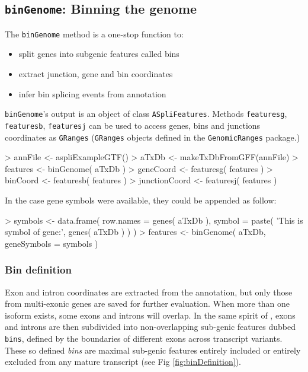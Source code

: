 \documentclass{article}
\begin{document}
\subsection{\texttt{binGenome}: Binning the genome }
\label{sectionBinG}

The \texttt{binGenome} method is a one-stop function to:
\begin{itemize}
 \item split genes into subgenic features called bins
 \item extract junction, gene and bin coordinates
 \item infer bin splicing events from annotation 
\end{itemize}

\texttt{binGenome}'s output is an object of class \texttt{ASpliFeatures}. 
Methods \texttt{featuresg}, \texttt{featuresb}, \texttt{featuresj} can be used to access genes, bins and junctions coordinates as \texttt{GRanges} (\texttt{GRanges} objects defined in the \texttt{GenomicRanges} package.) 

\begin{Schunk}
\begin{Sinput}
> annFile       <- aspliExampleGTF()
> aTxDb         <- makeTxDbFromGFF(annFile)
> features      <- binGenome( aTxDb ) 
> geneCoord     <- featuresg( features )
> binCoord      <- featuresb( features )
> junctionCoord <- featuresj( features )
\end{Sinput}
\end{Schunk}

In the case gene symbols were available, they could be appended as follow:

\begin{Schunk}
\begin{Sinput}
> symbols       <- data.frame( row.names = genes( aTxDb ), 
                              symbol = paste( 'This is symbol of gene:',
                                              genes( aTxDb ) ) )
> features      <- binGenome( aTxDb, geneSymbols = symbols ) 
\end{Sinput}
\end{Schunk}

\subsubsection{Bin definition}\label{sec:binDefinition}

Exon and intron coordinates are extracted from the annotation, but only those from multi-exonic genes are saved for further evaluation. When more than one isoform exists, some exons and introns will overlap. In the same spirit of \cite{pmid22722343}, exons and introns are then subdivided into non-overlapping sub-genic features dubbed \texttt{bins},  defined by the boundaries of different exons across transcript variants. These so defined {\em bins} are maximal sub-genic features entirely included or entirely excluded from any mature transcript (see Fig \ref{fig:binDefinition}).
\end{document}
